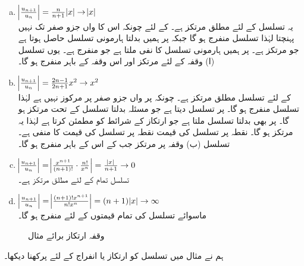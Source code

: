 \begin{enumerate}[a.]
\item
$\abs{\frac{u_{n+1}}{u_n}}=\frac{n}{n+1}\abs{x}\to\abs{x}$\\
 یہ تسلسل  کے لئے مطلق مرتکز ہے۔  کے لئے چونکہ اس کا  واں جزو صفر تک نہیں پہنچتا لہٰذا تسلسل منفرج ہو گا جبکہ  پر ہمیں بدلتا ہارمونی تسلسل  حاصل ہوتا ہے جو مرتکز ہے۔  پر ہمیں ہارمونی تسلسل کا نفی  ملتا ہے جو منفرج ہے۔ یوں تسلسل  (ا) وقفہ  کے لئے مرتکز اور اس وقفہ کے باہر منفرج ہو گا۔
\item
$\abs{\frac{u_{n+1}}{u_n}}=\frac{2n-1}{2n+1}x^2\to x^2$\\
 کے لئے تسلسل مطلق مرتکز ہے۔ چونکہ  پر  واں جزو صفر پر مرکوز نہیں ہے لہٰذا تسلسل منفرج ہو گا۔  پر تسلسل  دیتا ہے جو مسئلہ بدلتا تسلسل کے تحت مرتکز ہو گا۔  پر بھی بدلتا تسلسل ملتا ہے جو ارتکاز کے شرائط کو مطمئن کرتا ہے لہٰذا یہ مرتکز ہو گا۔ نقطہ  پر تسلسل کی قیمت نقطہ  پر تسلسل کی قیمت کا منفی ہے۔ تسلسل (ب) وقفہ  پر مرتکز جب کے اس کے باہر منفرج ہو گا۔
\item
$\abs{\frac{u_{n+1}}{u_n}}=\abs{\frac{x^{n+1}}{(n+1)!}\cdot\frac{n!}{x^n}}=\frac{\abs{x}}{n+1}\to 0$\\
تسلسل تمام  کے لئے مطلق مرتکز ہے۔
\item
$\abs{\frac{u_{n+1}}{u_n}}=\abs{\frac{(n+1)!x^{n+1}}{n!x^n}}=(n+1)\abs{x}\to\infty$\\
ماسوائے  تسلسل  کی تمام قیمتوں کے لئے منفرج ہو گا۔ 
\end{enumerate}
\begin{figure}
\centering
{}
\caption{وقفہ ارتکاز برائے مثال }
\label{شکل_مثال_تسلسل_مرتکز_منفرج_تسلسل}
\end{figure}
ہم نے مثال  میں تسلسل کو ارتکاز یا انفراج کے لئے پرکھنا دیکھا۔ 


